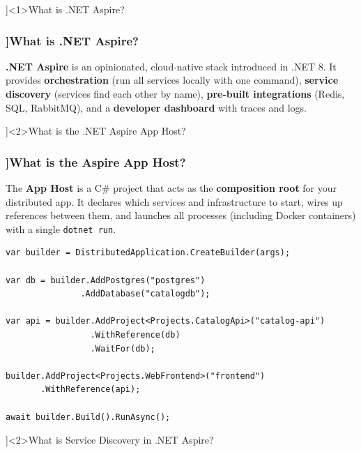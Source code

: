 
\QuestionSlide[\CategoryBadge[AspireColor!20]{.NET Aspire}]<1>{What is .NET Aspire?}

\begin{frame}[fragile]
  \frametitle{\AnswerTitle[\CategoryBadge[AspireColor!20]{.NET Aspire}]{What is .NET Aspire?}}

  {\footnotesize
  \textbf{.NET Aspire} is an opinionated, cloud-native stack introduced in .NET 8. It provides \textbf{orchestration} (run all services locally with one command), \textbf{service discovery} (services find each other by name), \textbf{pre-built integrations} (Redis, SQL, RabbitMQ), and a \textbf{developer dashboard} with traces and logs.
  }
\end{frame}

\QuestionSlide[\CategoryBadge[AspireColor!20]{.NET Aspire}]<2>{What is the .NET Aspire App Host?}

\begin{frame}[fragile]
  \frametitle{\AnswerTitle[\CategoryBadge[AspireColor!20]{.NET Aspire}]{What is the Aspire App Host?}}

  {\footnotesize
  The \textbf{App Host} is a C\# project that acts as the \textbf{composition root} for your distributed app. It declares which services and infrastructure to start, wires up references between them, and launches all processes (including Docker containers) with a single \texttt{dotnet run}.
  }

  \begin{verbatim}
var builder = DistributedApplication.CreateBuilder(args);

var db = builder.AddPostgres("postgres")
               .AddDatabase("catalogdb");

var api = builder.AddProject<Projects.CatalogApi>("catalog-api")
                 .WithReference(db)
                 .WaitFor(db);

builder.AddProject<Projects.WebFrontend>("frontend")
       .WithReference(api);

await builder.Build().RunAsync();
  \end{verbatim}
\end{frame}

\QuestionSlide[\CategoryBadge[AspireColor!20]{.NET Aspire}]<2>{What is Service Discovery in .NET Aspire?}

